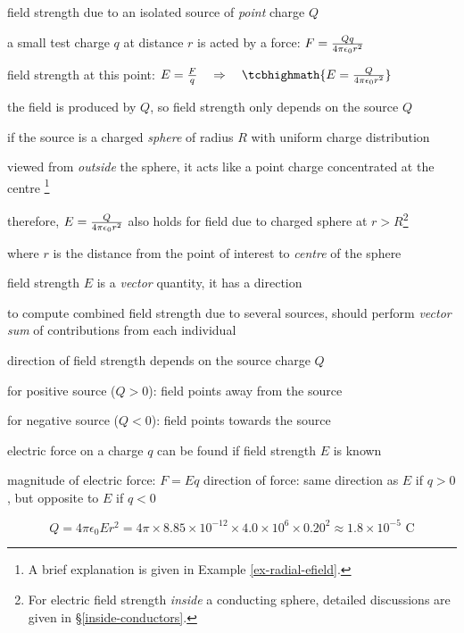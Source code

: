 \cmt field strength due to an isolated source of \emph{point} charge $Q$

a small test charge $q$ at distance $r$ is acted by a force: $F = \frac{Qq}{4\pi\epsilon_0 r^2}$

field strength at this point: $ E = \frac{F}{q} \RA \tcbhighmath{E=\frac{Q}{\ec r^2}}$

the field is produced by $Q$, so field strength only depends on the source $Q$

\cmt if the source is a charged \emph{sphere} of radius $R$ with uniform charge distribution

viewed from \emph{outside} the sphere, it acts like a point charge concentrated at the centre
\footnote{A brief explanation is given in Example \ref{ex-radial-efield}.}

therefore, $E=\frac{Q}{4\pi\epsilon_0 r^2}$ also holds for field due to charged sphere at $r>R$\footnote{For electric field strength \emph{inside} a conducting sphere, detailed discussions are given in \S\ref{inside-conductors}.}

where $r$ is the distance from the point of interest to \emph{centre} of the sphere

\cmt field strength $E$ is a \emph{vector} quantity, it has a direction

to compute combined field strength due to several sources, should perform \emph{vector sum} of contributions from each individual

\cmt direction of field strength depends on the source charge $Q$

for positive source ($Q>0$): field points away from the source

for negative source ($Q<0$): field points towards the source

\cmt electric force on a charge $q$ can be found if field strength $E$ is known

magnitude of electric force: $F=Eq$
direction of force: same direction as $E$ if $q>0$, but opposite to $E$ if $q<0$


	
\begin{soln} 
\begin{equation*}
	Q=4\pi\epsilon_0 Er^2 = 4\pi \times 8.85\times 10^{-12} \times 4.0 \times 10^6 \times 0.20^2 \approx 1.8 \times 10^{-5} \text{ C} 
\end{equation*}
\end{soln}



